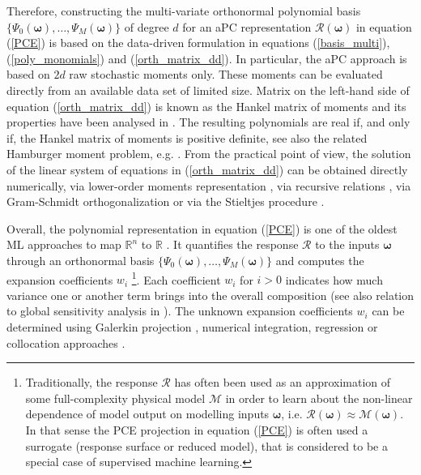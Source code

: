 \documentclass[a4paper,fleqn]{article}
\newcommand{\rw}[1]{\textcolor{blue}{#1}}
\newcommand{\del}[1]{\textcolor{red}{\sout{#1}}}
\renewcommand{\del}[1]{}
\renewcommand{\rw}[1]{#1}
\begin{document}
Therefore, constructing the multi-variate orthonormal polynomial basis $\big\{ \Psi_0(\bm{\omega}),\ldots, \Psi_M(\bm{\omega})\big\}$ of degree $d$ for an aPC representation  $\mathcal{R}(\bm{\omega})$ in equation (\ref{PCE}) is based on the data-driven formulation in equations (\ref{basis_multi}), (\ref{poly_monomials}) and (\ref{orth_matrix_dd}). In particular, the aPC approach is based on $2d$ raw stochastic moments only. These moments \del{could} \rw{can} be evaluated directly from an available data set of limited size. \del{Additionally, the matrix} \rw{Matrix} on the left-hand side of equation (\ref{orth_matrix_dd}) is known as the Hankel matrix of moments \cite{Karlin1968} and its properties have been analysed in \cite{Lindsay1989}. The resulting polynomials are real if, and only if, the Hankel matrix of moments is positive definite, see also the related Hamburger moment problem, e.g. \cite{akhiezer1965classical,MR2855645,shohat1943problem,MR3364576}. From the practical point of view, the solution of the linear system of equations in (\ref{orth_matrix_dd}) \del{could} \rw{can} be obtained directly numerically, via lower-order moments representation \cite{OladNowak_RESS2012}, via recursive relations \cite{Abramowitz1965}, via Gram-Schmidt orthogonalization \cite{Witteveen2007} or via the Stieltjes procedure \cite{Stieltjes1884}.

Overall, the polynomial representation in equation (\ref{PCE}) is one of the oldest ML approaches to map $\mathbb{R}^n$ to $\mathbb{R}$ . It quantifies the response $\mathcal{R}$ to the inputs $\bm{\omega}$ through an orthonormal basis $\big\{ \Psi_0(\bm{\omega}),\ldots, \Psi_M(\bm{\omega})\big\}$ and computes the expansion coefficients $w_{i}$ \footnote{Traditionally, the response $\mathcal{R}$ has often been used as an approximation of some full-complexity physical model $\mathcal{M}$ in order to learn about the non-linear dependence of model output on modelling inputs $\bm{\omega}$, i.e. $\mathcal{R}(\bm{\omega}) \approx \mathcal{M}(\bm{\omega})$. In that sense the PCE projection in equation (\ref{PCE}) is often used a surrogate (response surface or reduced model), that is considered to be a special case of supervised machine learning.}. Each coefficient $w_{i}$ for $i>0$ indicates how much variance one or another term brings into the overall composition (see also relation to global sensitivity analysis in \cite{oladyshkin2012global,zhang2016evaluation}). The unknown expansion coefficients $w_{i}$ can be determined using Galerkin projection \cite{koppel2019comparison,OladNowak_RESS2012}, numerical integration, regression or collocation approaches \cite{Li2007,Olad_al_CG2009,Villadsen1978}.
\end{document}
